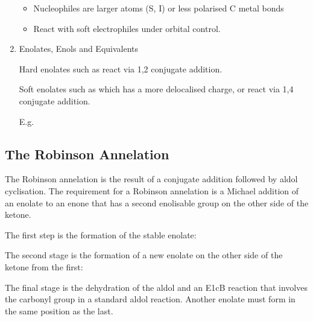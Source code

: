 \begin{enumerate}[label=\alph*)]
\begin{itemize}
      \item Nucleophiles are larger atoms (S, I) or less polarised C metal bonds

      \item React with soft electrophiles under orbital control.
    \end{itemize}

  \item Enolates, Enols and Equivalents

  Hard enolates such as  react via 1,2 conjugate addition.

  Soft enolates such as  which has a more delocalised charge,
  or  react via 1,4 conjugate addition.

  E.g.


\end{enumerate}

\subsection{The Robinson Annelation}

The Robinson annelation is the result of a conjugate addition followed by aldol
cyclisation. The requirement for a Robinson annelation is a Michael addition of
an enolate to an enone that has a second enolisable group on the other side of
the ketone.

The first step is the formation of the stable enolate:


The second stage is the formation of a new enolate on the other side of the
ketone from the first:


The final stage is the dehydration of the aldol and an E1cB reaction that involves
the carbonyl group in a standard aldol reaction. Another enolate must form in the
same position as the last.

